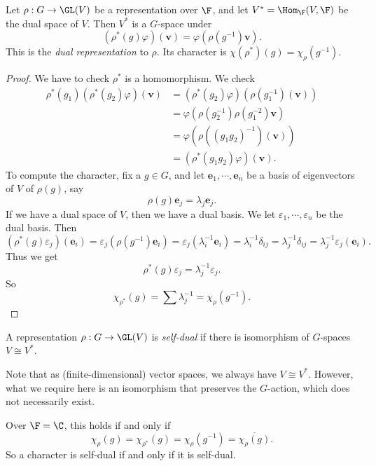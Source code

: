 \documentclass[a4paper]{article}
\begin{document}
\begin{lemma}
  Let $\rho: G \to \GL(V)$ be a representation over $\F$, and let $V^* = \Hom_\F (V, \F)$ be the dual space of $V$. Then $V^*$ is a $G$-space under
  \[
    (\rho^*(g) \varphi)(\mathbf{v}) = \varphi(\rho(g^{-1})\mathbf{v}).
  \]
  This is the \emph{dual representation} to $\rho$. Its character is $\chi(\rho^*)(g) = \chi_\rho(g^{-1})$.
\end{lemma}

\begin{proof}
  We have to check $\rho^*$ is a homomorphism. We check
  \begin{align*}
    \rho^*(g_1)(\rho^*(g_2)\varphi)(\mathbf{v}) &= (\rho^*(g_2)\varphi)(\rho(g_1^{-1})(\mathbf{v}))\\
    &= \varphi(\rho(g_2^{-1})\rho(g_1^{-2}) \mathbf{v})\\
    &= \varphi(\rho((g_1g_2)^{-1})(\mathbf{v}))\\
    &= (\rho^*(g_1g_2) \varphi)(\mathbf{v}).
  \end{align*}
  To compute the character, fix a $g \in G$, and let $\mathbf{e}_1, \cdots, \mathbf{e}_n$ be a basis of eigenvectors of $V$ of $\rho(g)$, say
  \[
    \rho(g) \mathbf{e}_j = \lambda_j \mathbf{e}_j.
  \]
  If we have a dual space of $V$, then we have a dual basis. We let $\varepsilon_1,\cdots, \varepsilon_n$ be the dual basis. Then
  \[
    (\rho^*(g) \varepsilon_j)(\mathbf{e}_i) = \varepsilon_j(\rho(g^{-1}) \mathbf{e}_i) = \varepsilon_j (\lambda_i^{-1} \mathbf{e}_i) = \lambda_i^{-1} \delta_{ij} = \lambda_j^{-1} \delta_{ij} = \lambda_j^{-1} \varepsilon_j(\mathbf{e}_i).
  \]
  Thus we get
  \[
    \rho^*(g) \varepsilon_j = \lambda_j^{-1} \varepsilon_j.
  \]
  So
  \[
    \chi_{\rho^*}(g) = \sum \lambda_j^{-1} = \chi_\rho(g^{-1}).
  \]
\end{proof}

\begin{defi}
  A representation $\rho: G \to \GL(V)$ is \emph{self-dual} if there is isomorphism of $G$-spaces $V\cong V^*$.
\end{defi}
Note that as (finite-dimensional) vector spaces, we always have $V \cong V^*$. However, what we require here is an isomorphism that preserves the $G$-action, which does not necessarily exist.

Over $\F = \C$, this holds if and only if
\[
  \chi_\rho(g) = \chi_{\rho^{*}} (g) = \chi_\rho(g^{-1}) = \overline{\chi_\rho(g)}.
\]
So a character is self-dual if and only if it is self-dual.
\end{document}
